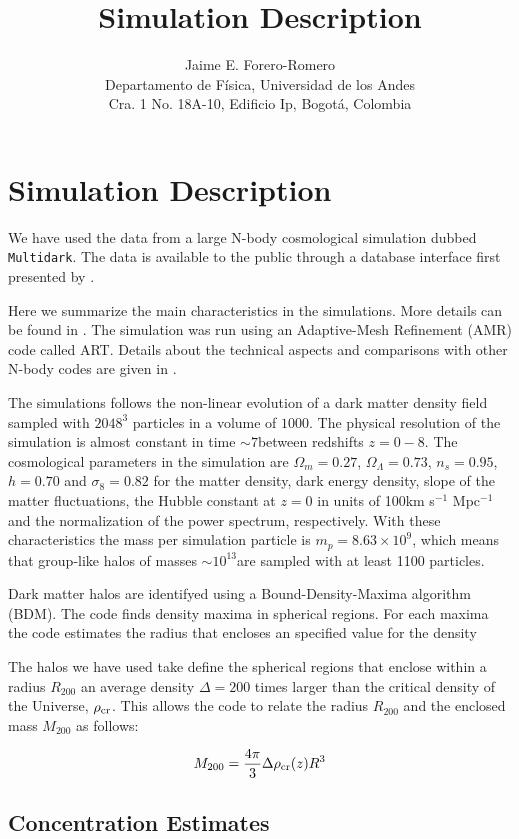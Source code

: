 \documentclass{article}
\title{Simulation Description}
\author{Jaime E. Forero-Romero\\ Departamento de F\'{i}sica, Universidad de los Andes\\ Cra. 1 No. 18A-10, Edificio Ip, Bogot\'a, Colombia}
\newcommand{\hMsun}{{\ifmmode{h^{-1}{\rm {M_{\odot}}}}\else{$h^{-1}{\rm{M_{\odot}}}$}\fi}}
\newcommand{\hMpc}{{\ifmmode{h^{-1}{\rm Mpc}}\else{$h^{-1}$Mpc }\fi}}
\newcommand{\hkpc}{{\ifmmode{h^{-1}{\rm kpc}}\else{$h^{-1}$kpc }\fi}}
\begin{document}
\maketitle
\section{Simulation Description}
We have used the data from a large N-body cosmological simulation
dubbed \verb"Multidark". The data is available to the public through a
database interface first presented by \cite{Riebe11}. 

Here we summarize the main characteristics in the simulations. More
details can be found in \cite{Prada12}. The simulation was run using
an Adaptive-Mesh Refinement (AMR) code called ART. Details about the
technical aspects and comparisons with other N-body codes are given in
\cite{Klypin09}.   

The simulations follows the non-linear evolution of a dark matter
density field sampled with $2048^3$ particles in a volume of
$1000$\hMpc. The physical resolution of the simulation is almost
constant in time $\sim 7$\hkpc between redshifts $z=0-8$. The
cosmological parameters in the simulation are $\Omega_m=0.27$,
$\Omega_{\Lambda}=0.73$, $n_{s}=0.95$, $h=0.70$ and $\sigma_8=0.82$ for
the matter density, dark energy density, slope of the matter
fluctuations, the Hubble constant at $z=0$ in units of 100km s$^{-1}$
Mpc$^{-1}$ and the normalization of the power spectrum, respectively. 
With these characteristics the mass per simulation particle is
$m_p=8.63\times 10^{9}$\hMsun, which means that group-like halos of masses
$\sim 10^{13}$\hMsun are sampled with at least 1100 particles. 

Dark matter halos are identifyed using a Bound-Density-Maxima
algorithm (BDM). The code finds density maxima in spherical
regions. For each maxima the code estimates the radius that encloses
an specified value for the density

The halos we have used take define the spherical regions that enclose
within a radius $R_{200}$ an average density $\Delta=200$ times larger than the
critical density of the Universe, $\rho_{\rm cr}$. This allows the
code to relate the radius $R_{200}$ and the enclosed mass $M_{200}$ as
follows: 

\begin{equation}
M_{200} = \frac{4\pi}{3}\Delta \rho_{\rm cr}(z)R^{3}
\end{equation}

\subsection{Concentration Estimates}
\end{document}
